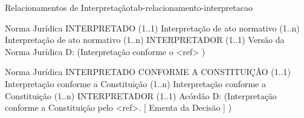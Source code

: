 \begin{tabelarelacionamento}{Relacionamentos
de Interpretação}{tab-relacionamento-interpretacao}

  \relacionamento
  	{Norma Jurídica}
 	{INTERPRETADO (1..1)}
 	{Interpretação de ato normativo}
 	{(1..n) Interpretação de ato normativo (1..n)}
 	{INTERPRETADOR (1..1)}
 	{Versão da Norma Jurídica}
 	{D: (Interpretação conforme o <ref> )}

  \relacionamento
  	{Norma Jurídica}
 	{INTERPRETADO CONFORME A CONSTITUIÇÃO (1..1)}
 	{Interpretação conforme a Constituição}
 	{(1..n) Interpretação conforme a Constituição (1..n)}
 	{INTERPRETADOR (1..1)}
 	{Acórdão}
 	{D: (Interpretação conforme a Constituição pelo <ref>. [ Ementa da Decisão ] )}

\end{tabelarelacionamento}


